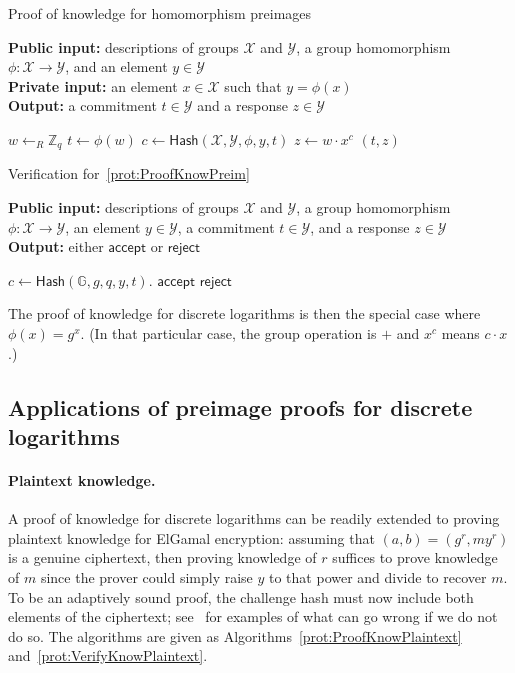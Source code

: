 \documentclass[12pt,a4paper]{article}
\theoremstyle{definition}
\begin{document}
\begin{algorithm}\caption{Proof of knowledge for homomorphism preimages}\label{prot:ProofKnowPreim}
    \textbf{Public input:} descriptions of groups $\mathcal{X}$ and $\mathcal{Y}$, a group homomorphism $\phi:\mathcal{X}\to\mathcal{Y}$, and an element $y\in\mathcal{Y}$\\
    \textbf{Private input:} an element $x\in\mathcal{X}$ such that $y = \phi(x)$\\
    \textbf{Output:} a commitment $t\in\mathcal{Y}$ and a response $z\in\mathcal{Y}$
    \begin{algorithmic}[1]
        \State $w\leftarrow_R\mathbb{Z}_q$
        \State $t \gets \phi(w)$
        \State $c\gets\mathsf{Hash}(\mathcal{X}, \mathcal{Y}, \phi, y, t)$
        \State $z\gets w\cdot x^c$
        \State \Return $(t, z)$
    \end{algorithmic}
\end{algorithm}
\begin{algorithm}\caption{Verification for~\ref{prot:ProofKnowPreim}}\label{prot:VerifyKnowPreim}
    \textbf{Public input:} descriptions of groups $\mathcal{X}$ and $\mathcal{Y}$, a group homomorphism $\phi:\mathcal{X}\to\mathcal{Y}$, an element $y\in\mathcal{Y}$, a commitment $t\in\mathcal{Y}$, and a response $z\in\mathcal{Y}$\\
    \textbf{Output:} either $\mathsf{accept}$ or $\mathsf{reject}$
    \begin{algorithmic}[1]
        \State $c\gets\mathsf{Hash}(\mathbb{G}, g, q, y, t)$.
            \State \Return $\mathsf{accept}$
        \Else
            \State \Return $\mathsf{reject}$
        \EndIf
    \end{algorithmic}
\end{algorithm}

The proof of knowledge for discrete logarithms is then the special case where $\phi(x) = g^x$. (In that particular case, the group operation is $+$ and $x^c$ means $c\cdot x$.)

\subsection{Applications of preimage proofs for discrete logarithms}\label{sec-plaintext-knowledge}
\paragraph{Plaintext knowledge.}
A proof of knowledge for discrete logarithms can be readily extended to proving plaintext knowledge for ElGamal encryption: assuming that $(a, b) = (g^r, my^r)$ is a genuine ciphertext, then proving knowledge of $r$ suffices to prove knowledge of $m$ since the prover could simply raise $y$ to that power and divide to recover $m$. To be an adaptively sound proof, the challenge hash must now include both elements of the ciphertext; see~\cite{mcmurtry2020test} for examples of what can go wrong if we do not do so. The algorithms are given as Algorithms~\ref{prot:ProofKnowPlaintext} and~\ref{prot:VerifyKnowPlaintext}.
\end{document}
